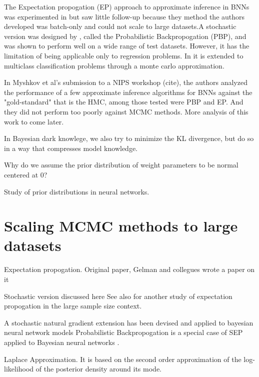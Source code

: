 \documentclass[]{report}
\begin{document}
\begin{enumerate}
The Expectation propogation (EP) approach to approximate inference in BNNs was experimented in \cite{jylanki2014expectation} but saw little follow-up because they method the authors developed was batch-only and could not scale to large datasets.A stochastic version was designed by \cite{hernandez2015probabilistic}, called the Probabilistic Backpropogation (PBP), and was shown to perform well on a wide range of test datasets. However, it has the limitation of being applicable only to regression problems. In \cite{ghosh2016assumed} it is extended to multiclass classification problems through a monte carlo approximation. 

In Myshkov et al's submission to a NIPS workshop (cite), the authors analyzed the performance of a few approximate inference algorithms for BNNs against the "gold-standard" that is the HMC, among those tested were PBP and EP. And they did not perform too poorly against MCMC methods. More analysis of this work to come later.  

In Bayesian dark knowlege, we also try to minimize the KL divergence, but do so
in a way that compresses model knowledge.  

Why do we assume the prior distribution of weight parameters to be normal centered at 0?

Study of prior distributions in neural networks.\cite{lampinen2001bayesian,titterington2004bayesian}

\section{Scaling MCMC methods to large datasets}




Expectation propogation. Original paper\cite{minka2001expectation}, Gelman and collegues wrote a paper on it \cite{gelman2014expectation}

Stochastic version discussed here \cite{li2015stochastic}
See also \cite{dehaene2015expectation} for another study of expectation propogation in the large sample size context. 

A stochastic natural gradient extension has been devised and applied to bayesian neural network models \cite{teh2015distributed}
Probabilistic Backpropogation is a special case of SEP applied to Bayesian neural networks \cite{hernandez2015probabilistic}.


Laplace Approximation. It is based on the second order approximation of the
log-likelihood of the posterior density around its mode.


\end{enumerate}
\end{document}
